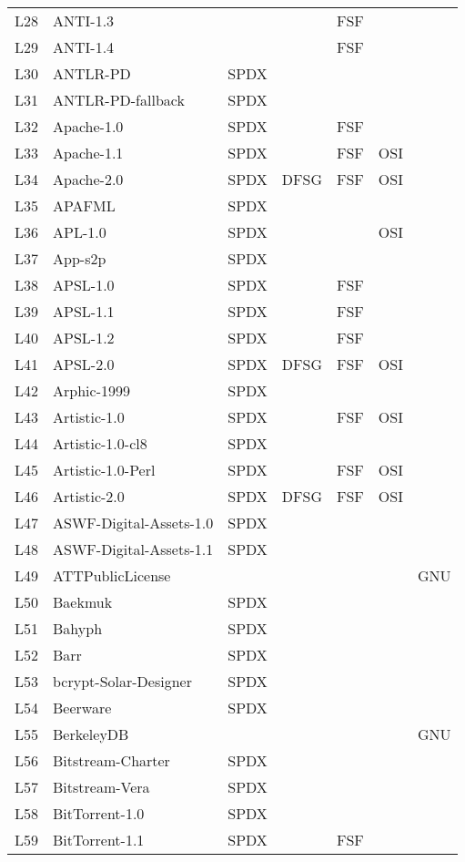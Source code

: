 \begin{longtable}[h]{m{2cm} | m{7cm} | c | c | c | c | c}
L28 & ANTI-1.3 &  &  & FSF &  &  \\
L29 & ANTI-1.4 &  &  & FSF &  &  \\
L30 & ANTLR-PD & SPDX &  &  &  &  \\
L31 & ANTLR-PD-fallback & SPDX &  &  &  &  \\
L32 & Apache-1.0 & SPDX &  & FSF &  &  \\
L33 & Apache-1.1 & SPDX &  & FSF & OSI &  \\
L34 & Apache-2.0 & SPDX & DFSG & FSF & OSI &  \\
L35 & APAFML & SPDX &  &  &  &  \\
L36 & APL-1.0 & SPDX &  &  & OSI &  \\
L37 & App-s2p & SPDX &  &  &  &  \\
L38 & APSL-1.0 & SPDX &  & FSF &  &  \\
L39 & APSL-1.1 & SPDX &  & FSF &  &  \\
L40 & APSL-1.2 & SPDX &  & FSF &  &  \\
L41 & APSL-2.0 & SPDX & DFSG & FSF & OSI &  \\
L42 & Arphic-1999 & SPDX &  &  &  &  \\
L43 & Artistic-1.0 & SPDX &  & FSF & OSI &  \\
L44 & Artistic-1.0-cl8 & SPDX &  &  &  &  \\
L45 & Artistic-1.0-Perl & SPDX &  & FSF & OSI &  \\
L46 & Artistic-2.0 & SPDX & DFSG & FSF & OSI &  \\
L47 & ASWF-Digital-Assets-1.0 & SPDX &  &  &  &  \\
L48 & ASWF-Digital-Assets-1.1 & SPDX &  &  &  &  \\
L49 & ATTPublicLicense &  &  &  &  & GNU \\
L50 & Baekmuk & SPDX &  &  &  &  \\
L51 & Bahyph & SPDX &  &  &  &  \\
L52 & Barr & SPDX &  &  &  &  \\
L53 & bcrypt-Solar-Designer & SPDX &  &  &  &  \\
L54 & Beerware & SPDX &  &  &  &  \\
L55 & BerkeleyDB &  &  &  &  & GNU \\
L56 & Bitstream-Charter & SPDX &  &  &  &  \\
L57 & Bitstream-Vera & SPDX &  &  &  &  \\
L58 & BitTorrent-1.0 & SPDX &  &  &  &  \\
L59 & BitTorrent-1.1 & SPDX &  & FSF &  &  \\

\end{longtable}
